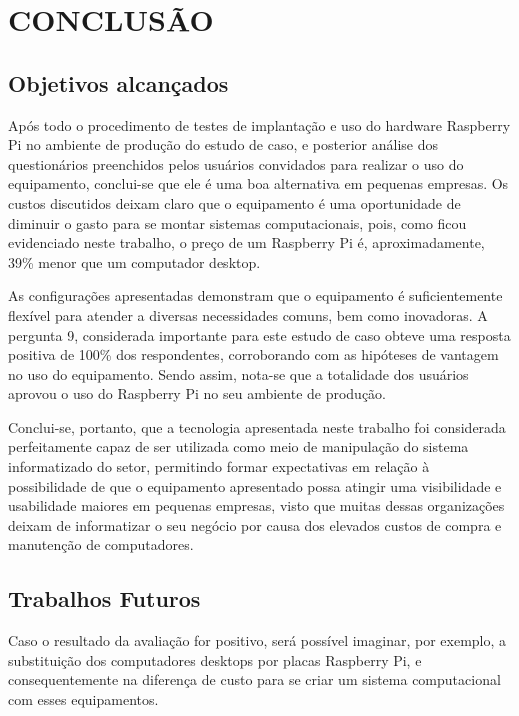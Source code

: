 \chapter{CONCLUSÃO}

\section{Objetivos alcançados}

Após todo o procedimento de testes de implantação e uso do hardware Raspberry Pi no ambiente de produção do estudo de caso, e posterior análise dos questionários preenchidos pelos usuários convidados para realizar o uso do equipamento, conclui-se que ele é uma boa alternativa em pequenas empresas.
Os custos discutidos deixam claro que o equipamento é uma oportunidade de diminuir o gasto para se montar sistemas computacionais, pois, como ficou evidenciado neste trabalho, o preço de um Raspberry Pi é, aproximadamente, 39\% menor que um computador desktop.

As configurações apresentadas demonstram que o equipamento é suficientemente flexível para atender a diversas necessidades comuns, bem como inovadoras.
A pergunta 9, considerada importante para este estudo de caso obteve uma resposta positiva de 100\% dos respondentes, corroborando com as hipóteses de vantagem no uso do equipamento. Sendo assim, nota-se que a totalidade dos usuários aprovou o uso do Raspberry Pi no seu ambiente de produção.

Conclui-se, portanto, que a tecnologia apresentada neste trabalho foi considerada perfeitamente capaz de ser utilizada como meio de manipulação do sistema informatizado do setor, permitindo formar expectativas em relação à possibilidade de que o equipamento apresentado possa atingir uma visibilidade e usabilidade maiores em pequenas empresas, visto que muitas dessas organizações deixam de informatizar o seu negócio por causa dos elevados custos de compra e manutenção de computadores.

\section{Trabalhos Futuros}

Caso o resultado da avaliação for positivo, será possível imaginar, por exemplo, a substituição dos computadores desktops por placas Raspberry Pi, e consequentemente na diferença de custo para se criar um sistema computacional com esses equipamentos.